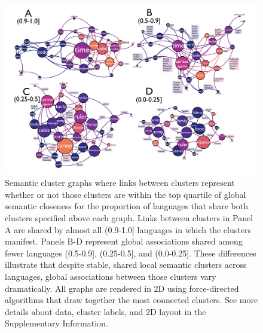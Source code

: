 \documentclass[9pt,twocolumn,twoside,lineno]{pnas-new}
\begin{document}
\begin{figure}[t!]
\centering
\includegraphics[width=16.7cm]{figs/Fig4.png}
\caption{Semantic cluster graphs where links between clusters represent whether or not those clusters are within the top quartile of global semantic closeness for the proportion of languages that share both clusters specified above each graph. Links between clusters in Panel A are shared by almost all (0.9-1.0] languages in which the clusters manifest. Panels B-D represent global associations shared among fewer languages (0.5-0.9], (0.25-0.5], and (0.0-0.25]. These differences illustrate that despite stable, shared local semantic clusters across languages, global associations between those clusters vary dramatically. All graphs are rendered in 2D using force-directed algorithms that draw together the most connected clusters. See more details about data, cluster labels, and 2D layout in the Supplementary Information.}
\label{fig:fig4} 
\end{figure}
\end{document}
